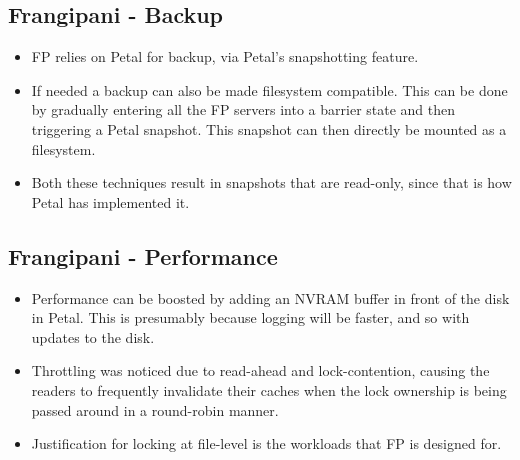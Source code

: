 \documentclass[parskip=half]{scrartcl}
\begin{document}

    \subsection{Frangipani - Backup} %
    \label{sub:frangipani_backup}

        \begin{itemize}
            \item 
            FP relies on Petal for backup, via Petal's snapshotting feature.
            \item 
            If needed a backup can also be made filesystem compatible. This can be done by gradually entering all the FP servers into a barrier state and then triggering a Petal snapshot. This snapshot can then directly be mounted as a filesystem.
            \item 
            Both these techniques result in snapshots that are read-only, since that is how Petal has implemented it.
        \end{itemize}
    

    \subsection{Frangipani - Performance} %
    \label{sub:frangipani_performance}

        \begin{itemize}
            \item 
            Performance can be boosted by adding an NVRAM buffer in front of the disk in Petal. This is presumably because logging will be faster, and so with updates to the disk.
            \item 
            Throttling was noticed due to read-ahead and lock-contention, causing the readers to frequently invalidate their caches when the lock ownership is being passed around in a round-robin manner.
            \item 
            Justification for locking at file-level is the workloads that FP is designed for.
        \end{itemize}




\newpage
\end{document}
